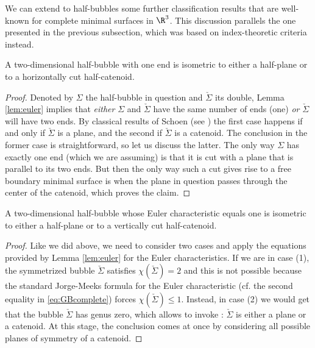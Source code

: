         	
        	
        	We can extend to half-bubbles some further classification results that are well-known for complete minimal surfaces in $\R^3$. This discussion parallels the one presented in the previous subsection, which was based on index-theoretic criteria instead.
        	
        	
        	\begin{cor}\label{cor:oneend}
        		A two-dimensional half-bubble with one end is isometric to either a half-plane or to a horizontally cut half-catenoid.
        	\end{cor}	
        	
        	\begin{proof}
        		Denoted by $\Sigma$ the half-bubble in question and $\check{\Sigma}$ its double, Lemma \ref{lem:euler} implies that \textsl{either} $\Sigma$ and $\check{\Sigma}$ have the same number of ends (one) \textsl{or} $\check{\Sigma}$ will have two ends. By classical results of Schoen (see \cite{Sc83}) the first case happens if and only if $\check{\Sigma}$ is a plane, and the second if $\check{\Sigma}$ is a catenoid. The conclusion in the former case is straightforward, so let us discuss the latter. The only way $\Sigma$ has exactly one end (which we are assuming) is that it is cut with a plane that is parallel to its two ends. But then the only way such a cut gives rise to a free boundary minimal surface is when the plane in question passes through the center of the catenoid, which proves the claim.
        	\end{proof}	
        	
        	\begin{cor}\label{cor:genuszero}
        		A two-dimensional half-bubble whose Euler characteristic equals one is isometric to either a half-plane or to a vertically cut half-catenoid.
        	\end{cor}	
        	
        	\begin{proof}
        		Like we did above, we need to consider two cases and apply the equations provided by Lemma \ref{lem:euler} for the Euler characteristics. If we are in case (1), the symmetrized bubble $\check{\Sigma}$ satisfies $\chi(\check{\Sigma})=2$ and this is not possible because the standard Jorge-Meeks formula for the Euler characteristic (cf. the second equality in \eqref{eq:GBcomplete}) forces $\chi(\check{\Sigma})\leqslant 1$. 
        		Instead, in case (2) we would get that the bubble $\check{\Sigma}$ has genus zero, which allows to invoke \cite{LR91}: $\check{\Sigma}$ is either a plane or a catenoid. At this stage, the conclusion comes at once by considering all possible planes of symmetry of a catenoid.
        	\end{proof}	
        	
        	
        	 	
        	 	
